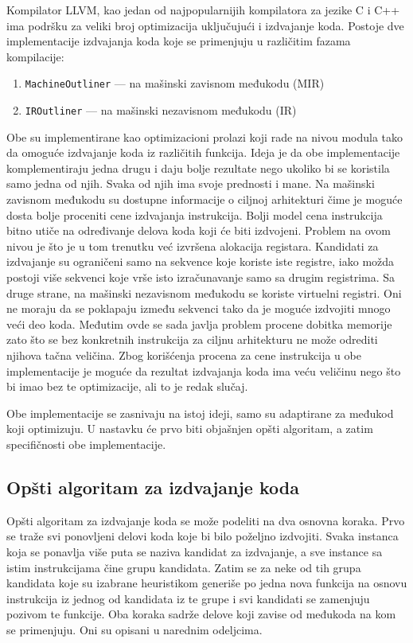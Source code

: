 \documentclass[12pt,oneside]{memoir}
\begin{document}
Kompilator LLVM, kao jedan od najpopularnijih kompilatora za jezike C i C++ ima podršku za veliki broj optimizacija uključujući i izdvajanje koda.
Postoje dve implementacije izdvajanja koda koje se primenjuju u različitim fazama kompilacije:
\begin{enumerate}
  \item \verb|MachineOutliner| --- na mašinski zavisnom međukodu (MIR) \cite{paquette2016machineoutliner} %
  \item \verb|IROutliner| --- na mašinski nezavisnom međukodu (IR) \cite{litteken2020iroutliner} %
\end{enumerate}
Obe su implementirane kao optimizacioni prolazi koji rade na nivou modula tako da omoguće izdvajanje koda iz različitih funkcija.
Ideja je da obe implementacije komplementiraju jedna drugu i daju bolje rezultate nego ukoliko bi se koristila samo jedna od njih.
Svaka od njih ima svoje prednosti i mane.
Na mašinski zavisnom međukodu su dostupne informacije o ciljnoj arhitekturi čime je moguće dosta bolje proceniti cene izdvajanja instrukcija.
Bolji model cena instrukcija bitno utiče na određivanje delova koda koji će biti izdvojeni.
Problem na ovom nivou je što je u tom trenutku već izvršena alokacija registara.
Kandidati za izdvajanje su ograničeni samo na sekvence koje koriste iste registre, iako možda postoji više sekvenci koje vrše isto izračunavanje samo sa drugim registrima.
Sa druge strane, na mašinski nezavisnom međukodu se koriste virtuelni registri.
Oni ne moraju da se poklapaju između sekvenci tako da je moguće izdvojiti mnogo veći deo koda.
Međutim ovde se sada javlja problem procene dobitka memorije zato što se bez konkretnih instrukcija za ciljnu arhitekturu ne može odrediti njihova tačna veličina.
Zbog korišćenja procena za cene instrukcija u obe implementacije je moguće da rezultat izdvajanja koda ima veću veličinu nego što bi imao bez te optimizacije, ali to je redak slučaj.

Obe implementacije se zasnivaju na istoj ideji, samo su adaptirane za međukod koji optimizuju.
U nastavku će prvo biti objašnjen opšti algoritam, a zatim specifičnosti obe implementacije.

\subsection{Opšti algoritam za izdvajanje koda}

Opšti algoritam za izdvajanje koda se može podeliti na dva osnovna koraka.
Prvo se traže svi ponovljeni delovi koda koje bi bilo poželjno izdvojiti.
Svaka instanca koja se ponavlja više puta se naziva kandidat za izdvajanje, a sve instance sa istim instrukcijama čine grupu kandidata.
Zatim se za neke od tih grupa kandidata koje su izabrane heuristikom generiše po jedna nova funkcija na osnovu instrukcija iz jednog od kandidata iz te grupe i svi kandidati se zamenjuju pozivom te funkcije.
Oba koraka sadrže delove koji zavise od međukoda na kom se primenjuju. Oni su opisani u narednim odeljcima.
\end{document}
